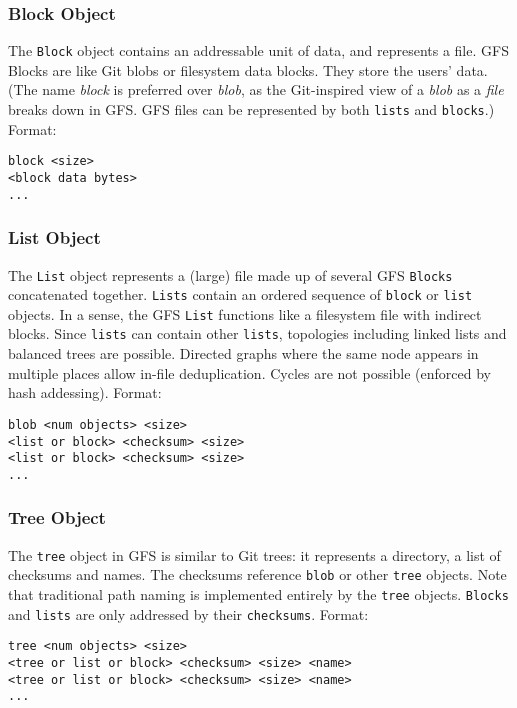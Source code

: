\documentclass{sig-alternate}
\begin{document}
\subsubsection{Block Object}

The \texttt{Block} object contains an addressable unit of data, and
represents a file.
GFS Blocks are like Git blobs or filesystem data blocks. They store the
users' data. (The name \textit{block} is preferred over \textit{blob}, as the
Git-inspired view of a \textit{blob} as a \textit{file} breaks down in GFS.
GFS files can be represented by both \texttt{lists} and \texttt{blocks}.)
Format:
\begin{verbatim}
block <size>
<block data bytes>
...
\end{verbatim}


\subsubsection{List Object}

The \texttt{List} object represents a (large) file made up of several
GFS \texttt{Blocks} concatenated together. \texttt{Lists} contain
an ordered sequence of \texttt{block} or \texttt{list} objects.
In a sense, the GFS \texttt{List} functions like a filesystem file with
indirect blocks. Since \texttt{lists} can contain other \texttt{lists}, topologies including linked lists and balanced trees are possible. Directed graphs where the same node appears in multiple places allow in-file deduplication. Cycles are not possible (enforced by hash addessing).
Format:
\begin{verbatim}
blob <num objects> <size>
<list or block> <checksum> <size>
<list or block> <checksum> <size>
...
\end{verbatim}


\subsubsection{Tree Object}

The \texttt{tree} object in GFS is similar to Git trees: it represents a
directory, a list of checksums and names. The checksums reference \texttt{blob}
or other \texttt{tree} objects. Note that traditional path naming
is implemented entirely by the \texttt{tree} objects. \texttt{Blocks} and
\texttt{lists} are only addressed by their \texttt{checksums}.
Format:
\begin{verbatim}
tree <num objects> <size>
<tree or list or block> <checksum> <size> <name>
<tree or list or block> <checksum> <size> <name>
...
\end{verbatim}
\end{document}
